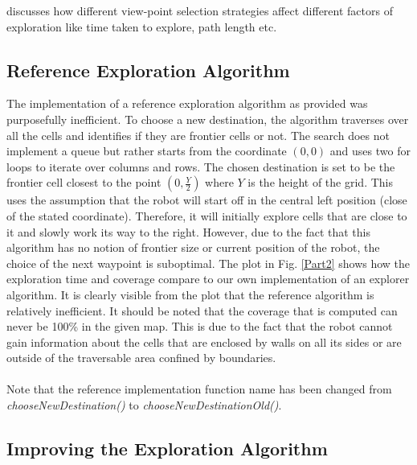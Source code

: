 \documentclass[a4paper,12pt]{article}
\begin{document}
					\cite{stachniss2003exploring} discusses how different view-point selection strategies affect different factors of exploration like time taken to explore, path length etc.

			\subsection{Reference Exploration Algorithm}

				The implementation of a reference exploration algorithm as provided was purposefully inefficient. To choose a new destination, the algorithm traverses over all the cells and identifies if they are frontier cells or not. The search does not implement a queue but rather starts from the coordinate $(0,0)$ and uses two for loops to iterate over columns and rows. The chosen destination is set to be the frontier cell closest to the point $(0,\frac{Y}{2})$ where $Y$ is the height of the grid. This uses the assumption that the robot will start off in the central left position (close of the stated coordinate). Therefore, it will initially explore cells that are close to it and slowly work its way to the right. However, due to the fact that this algorithm has no notion of frontier size or current position of the robot, the choice of the next waypoint is suboptimal. The plot in Fig. \ref{Part2} shows how the exploration time and coverage compare to our own implementation of an explorer algorithm. It is clearly visible from the plot that the reference algorithm is relatively inefficient. It should be noted that the coverage that is computed can never be 100\% in the given map. This is due to the fact that the robot cannot gain information about the cells that are enclosed by walls on all its sides or are outside of the traversable area confined by boundaries.  
				\\
				\\
				Note that the reference implementation function name has been changed from \textit{chooseNewDestination()} to \textit{chooseNewDestinationOld()}.
			
			\subsection{Improving the Exploration Algorithm}
\end{document}
